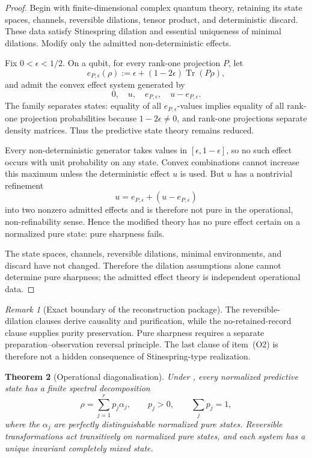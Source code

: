 \documentclass[11pt]{article}
\newtheorem{theorem}{Theorem}[section]
\theoremstyle{definition}
\theoremstyle{remark}
\newtheorem{remark}[theorem]{Remark}
\newcommand{\Tr}{\operatorname{Tr}}
\begin{document}
\begin{proof}
Begin with finite-dimensional complex quantum theory, retaining its state
spaces, channels, reversible dilations, tensor product, and deterministic
discard.  These data satisfy Stinespring dilation and essential uniqueness of
minimal dilations.  Modify only the admitted non-deterministic effects.

Fix \(0<\epsilon<1/2\).  On a qubit, for every rank-one projection \(P\), let
\[
 e_{P,\epsilon}(\rho)
 :=
 \epsilon+(1-2\epsilon)\Tr(P\rho),
\]
and admit the convex effect system generated by
\[
 0,\quad u,\quad e_{P,\epsilon},\quad u-e_{P,\epsilon}.
\]
The family separates states: equality of all \(e_{P,\epsilon}\)-values implies
equality of all rank-one projection probabilities because \(1-2\epsilon\ne0\),
and rank-one projections separate density matrices.  Thus the predictive
state theory remains reduced.

Every non-deterministic generator takes values in
\([\epsilon,1-\epsilon]\), so no such effect occurs with unit probability on
any state.  Convex combinations cannot increase this maximum unless the
deterministic effect \(u\) is used.  But \(u\) has a nontrivial refinement
\[
 u=e_{P,\epsilon}+(u-e_{P,\epsilon})
\]
into two nonzero admitted effects and is therefore not pure in the
operational, non-refinability sense.  Hence the modified theory has no pure
effect certain on a normalized pure state: pure sharpness fails.

The state spaces, channels, reversible dilations, minimal environments, and
discard have not changed.  Therefore the dilation assumptions alone cannot
determine pure sharpness; the admitted effect theory is independent
operational data.
\end{proof}

\begin{remark}[Exact boundary of the reconstruction package]
The reversible-dilation clauses derive causality and purification, while the
no-retained-record clause supplies purity preservation.  Pure sharpness
requires a separate preparation--observation reversal principle.  The last
clause of item~\textup{(O2)} is therefore not a hidden consequence of
Stinespring-type realization.
\end{remark}

\begin{theorem}[Operational diagonalisation]
\label{thm:operational-diagonalization}
Under , every normalized predictive state has a
finite spectral decomposition
\[
 \rho=\sum_{j=1}^{r}p_j\alpha_j,
 \qquad p_j>0,
 \qquad \sum_jp_j=1,
\]
where the $\alpha_j$ are perfectly distinguishable normalized pure states.
Reversible transformations act transitively on normalized pure states, and each
system has a unique invariant completely mixed state.
\end{theorem}
\end{document}
